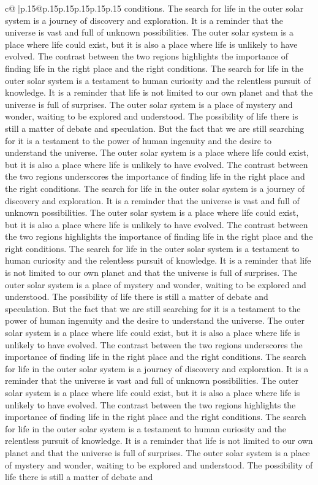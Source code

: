 \documentclass{article}
\begin{document}
{\begin{supertabular}{c@{$\;$}|p{.15\linewidth}@{}p{.15\linewidth}p{.15\linewidth}p{.15\linewidth}p{.15\linewidth}p{.15\linewidth}}
{{{conditions. The search for life in the outer solar system is a journey of discovery and exploration. It is a reminder that the universe is vast and full of unknown possibilities. The outer solar system is a place where life could exist, but it is also a place where life is unlikely to have evolved. The contrast between the two regions highlights the importance of finding life in the right place and the right conditions. The search for life in the outer solar system is a testament to human curiosity and the relentless pursuit of knowledge. It is a reminder that life is not limited to our own planet and that the universe is full of surprises. The outer solar system is a place of mystery and wonder, waiting to be explored and understood. The possibility of life there is still a matter of debate and speculation. But the fact that we are still searching for it is a testament to the power of human ingenuity and the desire to understand the universe. The outer solar system is a place where life could exist, but it is also a place where life is unlikely to have evolved. The contrast between the two regions underscores the importance of finding life in the right place and the right conditions. The search for life in the outer solar system is a journey of discovery and exploration. It is a reminder that the universe is vast and full of unknown possibilities. The outer solar system is a place where life could exist, but it is also a place where life is unlikely to have evolved. The contrast between the two regions highlights the importance of finding life in the right place and the right conditions. The search for life in the outer solar system is a testament to human curiosity and the relentless pursuit of knowledge. It is a reminder that life is not limited to our own planet and that the universe is full of surprises. The outer solar system is a place of mystery and wonder, waiting to be explored and understood. The possibility of life there is still a matter of debate and speculation. But the fact that we are still searching for it is a testament to the power of human ingenuity and the desire to understand the universe. The outer solar system is a place where life could exist, but it is also a place where life is unlikely to have evolved. The contrast between the two regions underscores the importance of finding life in the right place and the right conditions. The search for life in the outer solar system is a journey of discovery and exploration. It is a reminder that the universe is vast and full of unknown possibilities. The outer solar system is a place where life could exist, but it is also a place where life is unlikely to have evolved. The contrast between the two regions highlights the importance of finding life in the right place and the right conditions. The search for life in the outer solar system is a testament to human curiosity and the relentless pursuit of knowledge. It is a reminder that life is not limited to our own planet and that the universe is full of surprises. The outer solar system is a place of mystery and wonder, waiting to be explored and understood. The possibility of life there is still a matter of debate and }}}
\end{supertabular}}
\end{document}
